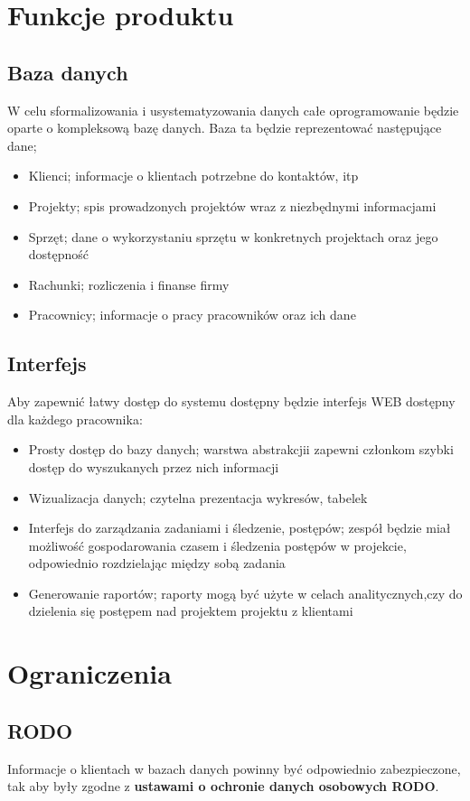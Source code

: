 \documentclass{article}
\begin{document}
\section{Funkcje produktu}
\subsection{Baza danych}
W celu sformalizowania i usystematyzowania danych całe oprogramowanie będzie oparte
o kompleksową bazę danych. Baza ta będzie reprezentować następujące dane;
\begin{itemize}
    \item Klienci; informacje o klientach potrzebne do kontaktów, itp
    \item Projekty; spis prowadzonych projektów wraz z niezbędnymi informacjami
    \item Sprzęt; dane o wykorzystaniu sprzętu w konkretnych projektach oraz jego dostępność
    \item Rachunki; rozliczenia i finanse firmy
    \item Pracownicy; informacje o pracy pracowników oraz ich dane
\end{itemize}
\subsection{Interfejs}
Aby zapewnić łatwy dostęp do systemu dostępny będzie interfejs WEB dostępny dla każdego pracownika:
\begin{itemize}
    \item Prosty dostęp do bazy danych; warstwa abstrakcjii zapewni członkom szybki dostęp do wyszukanych przez nich informacji
    \item Wizualizacja danych; czytelna prezentacja wykresów, tabelek
    \item Interfejs do zarządzania zadaniami i śledzenie, postępów; zespół będzie miał możliwość gospodarowania czasem i śledzenia postępów w projekcie, odpowiednio rozdzielając między sobą zadania
    \item Generowanie raportów; raporty mogą być użyte w celach analitycznych,czy do dzielenia się postępem nad projektem projektu z klientami
\end{itemize}
\section{Ograniczenia}
\subsection{RODO}
Informacje o klientach w bazach danych powinny być odpowiednio zabezpieczone, tak aby były zgodne z \textbf{ustawami o ochronie danych osobowych RODO}.
\end{document}
